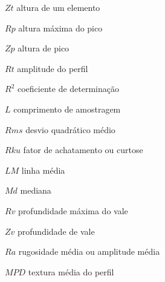 \documentclass[
        12pt,
        openany, %
        oneside, %
        a4paper,			
        english,			
        brazil			        %
        abntfigtabnum     
        ]{abntbibifspcampinas}
\begin{document}
\begin{simbolos} %
 \item[$Zt$] altura de um elemento%
\item[$Rp$] altura máxima do pico%
\item[$Zp$] altura de pico%
\item[$Rt$] amplitude do perfil%
\item[$R^2$] coeficiente de determinação
\item[$L$] comprimento de amostragem%
\item[$Rms$] desvio quadrático médio%
\item[$Rku$] fator de achatamento ou curtose%
\item[$LM$] linha média%
\item[$Md$] mediana%
\item[$Rv$] profundidade máxima do vale%
\item[$Zv$] profundidade de vale%
\item[$Ra$] rugosidade média ou amplitude média%
\item[$MPD$] textura média do perfil%
 \end{simbolos}

\pagestyle{empty}

\tableofcontents
\cleardoublepage



\textual
\pagestyle{scrplain} 
\clearscrheadfoot            %
\rohead[\pagemark]{\pagemark}%





\pagestyle{scrplain} 

\pagestyle{scrplain} 

\postextual



\end{document}
